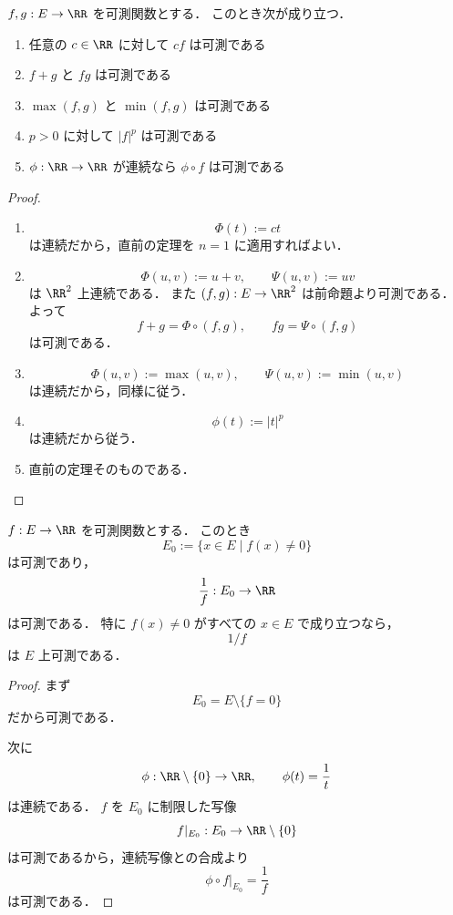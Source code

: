 \begin{corollary}[代数演算と合成]
$f,g:E\to\RR$ を可測関数とする．
このとき次が成り立つ．
\begin{enumerate}
    \item 任意の $c\in\RR$ に対して $cf$ は可測である
    \item $f+g$ と $fg$ は可測である
    \item $\max(f,g)$ と $\min(f,g)$ は可測である
    \item $p>0$ に対して $|f|^p$ は可測である
    \item $\phi:\RR\to\RR$ が連続なら $\phi\circ f$ は可測である
\end{enumerate}
\end{corollary}
\begin{proof}
\begin{enumerate}
    \item
    \[
    \Phi(t):=ct
    \]
    は連続だから，直前の定理を $n=1$ に適用すればよい．

    \item
    \[
    \Phi(u,v):=u+v,\qquad \Psi(u,v):=uv
    \]
    は $\RR^2$ 上連続である．
    また $(f,g):E\to\RR^2$ は前命題より可測である．
    よって
    \[
    f+g=\Phi\circ(f,g),\qquad fg=\Psi\circ(f,g)
    \]
    は可測である．

    \item
    \[
    \Phi(u,v):=\max(u,v),\qquad \Psi(u,v):=\min(u,v)
    \]
    は連続だから，同様に従う．

    \item
    \[
    \phi(t):=|t|^p
    \]
    は連続だから従う．

    \item 直前の定理そのものである．
\end{enumerate}
\end{proof}

\begin{proposition}[逆数]
$f:E\to\RR$ を可測関数とする．
このとき
\[
E_0:=\{x\in E\mid f(x)\ne 0\}
\]
は可測であり，
\[
\frac{1}{f}:E_0\to\RR
\]
は可測である．
特に $f(x)\ne 0$ がすべての $x\in E$ で成り立つなら，
\[
1/f
\]
は $E$ 上可測である．
\end{proposition}
\begin{proof}
まず
\[
E_0=E\setminus\{f=0\}
\]
だから可測である．

次に
\[
\phi:\RR\setminus\{0\}\to\RR,
\qquad
\phi(t)=\frac1t
\]
は連続である．
$f$ を $E_0$ に制限した写像
\[
f|_{E_0}:E_0\to \RR\setminus\{0\}
\]
は可測であるから，連続写像との合成より
\[
\phi\circ f|_{E_0}=\frac1f
\]
は可測である．
\end{proof}

